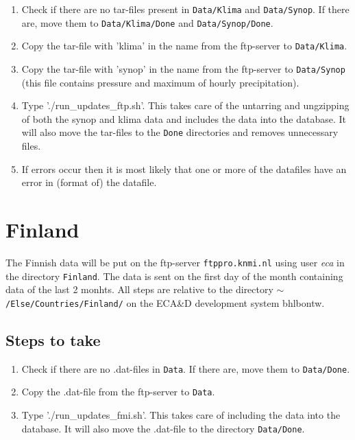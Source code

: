 \documentclass[a4paper]{article}
\begin{document}
\begin{enumerate}
\item Check if there are no tar-files present in \texttt{Data/Klima}
  and \texttt{Data/Synop}. If there are, move them to
  \texttt{Data/Klima/Done} and \texttt{Data/Synop/Done}.
\item Copy the tar-file with 'klima' in the name from the ftp-server
  to \texttt{Data/Klima}.
\item Copy the tar-file with 'synop' in the name from the ftp-server
  to \texttt{Data/Synop} (this file contains pressure and maximum of
  hourly precipitation).
\item Type './run\_updates\_ftp.sh'. This takes care of the untarring
  and ungzipping of both the synop and klima data and includes the
  data into the database. It will also move the tar-files to the
  \texttt{Done} directories and removes unnecessary files.
\item If errors occur then it is most likely that one or more of the
  datafiles have an error in (format of) the datafile.
\end{enumerate}



\section{Finland}

The Finnish data will be put on the ftp-server \texttt{ftppro.knmi.nl}
using user \textit{eca} in the directory \texttt{Finland}. The data is
sent on the first day of the month containing data of the last 2
monhts. All steps are relative to the directory
\texttt{$\sim$/Else/Countries/Finland/} on the ECA\&D development
system bhlbontw.


\subsection*{Steps to take}

\begin{enumerate}
\item Check if there are no .dat-files in \texttt{Data}. If there are,
  move them to \texttt{Data/Done}.
\item Copy the .dat-file from the ftp-server to \texttt{Data}.
\item Type './run\_updates\_fmi.sh'. This takes care of including the
  data into the database. It will also move the .dat-file to the
  directory \texttt{Data/Done}.
\end{enumerate}
\end{document}
